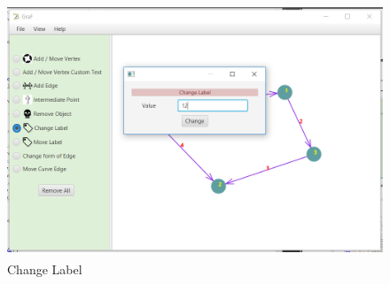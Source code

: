 \documentclass[a4paper,10pt]{article}
\begin{document}
\paragraph{}
\begin{figure}[H]
		\centering
		\includegraphics[height = 3in]{changeLabelFunction2.png}
		\caption[Optional caption]{Change Label}
		\label{fig:Repository}
	\end{figure}
\paragraph{}
	\paragraph{}
\end{document}
